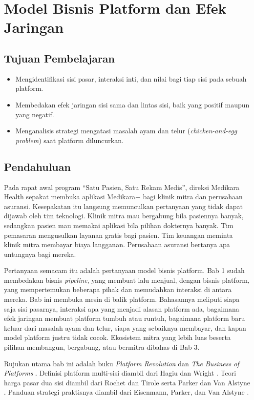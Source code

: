 \chapter{Model Bisnis Platform dan Efek Jaringan}
\label{ch:ch02}

\section*{Tujuan Pembelajaran}
\begin{itemize}
  \item Mengidentifikasi sisi pasar, interaksi inti, dan nilai bagi tiap sisi pada sebuah platform.
  \item Membedakan efek jaringan sisi sama dan lintas sisi, baik yang positif maupun yang negatif.
  \item Menganalisis strategi mengatasi masalah ayam dan telur (\textit{chicken-and-egg problem}) saat platform diluncurkan.
\end{itemize}

\section{Pendahuluan}

Pada rapat awal program ``Satu Pasien, Satu Rekam Medis'', direksi Medikara
Health sepakat membuka aplikasi Medikara+ bagi klinik mitra dan perusahaan
asuransi. Kesepakatan itu langsung memunculkan pertanyaan yang tidak dapat
dijawab oleh tim teknologi. Klinik mitra mau bergabung bila pasiennya banyak,
sedangkan pasien mau memakai aplikasi bila pilihan dokternya banyak. Tim
pemasaran mengusulkan layanan gratis bagi pasien. Tim keuangan meminta klinik
mitra membayar biaya langganan. Perusahaan asuransi bertanya apa untungnya bagi
mereka.

Pertanyaan semacam itu adalah pertanyaan model bisnis platform. Bab 1 sudah
membedakan bisnis \textit{pipeline}, yang membuat lalu menjual, dengan bisnis
platform, yang mempertemukan beberapa pihak dan memudahkan interaksi di antara
mereka. Bab ini membuka mesin di balik platform. Bahasannya meliputi siapa saja
sisi pasarnya, interaksi apa yang menjadi alasan platform ada, bagaimana efek
jaringan membuat platform tumbuh atau runtuh, bagaimana platform baru keluar
dari masalah ayam dan telur, siapa yang sebaiknya membayar, dan kapan model
platform justru tidak cocok. Ekosistem mitra yang lebih luas beserta pilihan
membangun, bergabung, atau bermitra dibahas di Bab 3.

Rujukan utama bab ini adalah buku \textit{Platform Revolution}
\cite{parker2016platform} dan \textit{The Business of Platforms}
\cite{cusumano2019business}. Definisi platform multi-sisi diambil dari Hagiu dan
Wright \cite{hagiu2015multisided}. Teori harga pasar dua sisi diambil dari
Rochet dan Tirole \cite{rochet2003platform} serta Parker dan Van Alstyne
\cite{parker2005twosided}. Panduan strategi praktisnya diambil dari Eisenmann,
Parker, dan Van Alstyne \cite{eisenmann2006strategies}.

